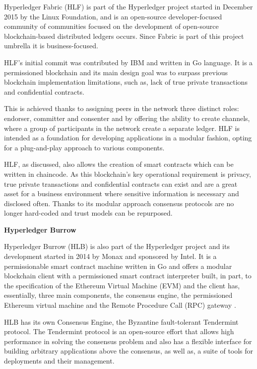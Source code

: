 \documentclass[notitlepage]{llncs}
\begin{document}
Hyperledger Fabric (HLF) is part of the Hyperledger project started in December 2015 by the Linux Foundation, and is an open-source developer-focused community of communities focused on the development of open-source blockchain-based distributed ledgers occurs. Since Fabric is part of  this project umbrella it is business-focused.
\par
HLF’s initial commit was contributed by IBM and written in Go language. It is a permissioned blockchain and its main design goal was to surpass previous blockchain implementation limitations, such as, lack of true private transactions and confidential contracts.
\par
This is achieved thanks to assigning peers in the network three distinct roles: endorser, committer and consenter and by offering the ability to create channels, where a group of participants in the network create a separate ledger. HLF is intended as a foundation for developing applications in a modular fashion, opting for a plug-and-play approach to various components. \cite{HyperledgerFabricDocs2017}
\par
HLF, as discussed, also allows the creation of smart contracts which can be written in chaincode. As this blockchain's key operational requirement is privacy, true private transactions and confidential contracts can exist and are a great asset for a business environment where sensitive information is necessary and disclosed often. Thanks to its modular approach consensus protocols are no longer hard-coded and trust models can be repurposed.
\par
\vspace{10pt}
\textbf{Hyperledger Burrow}
\vspace{6pt}

Hyperledger Burrow (HLB) is also part of the Hyperledger project and its development started in 2014 by Monax and sponsored by Intel. It is a permissionable smart contract machine written in Go and offers a modular blockchain client with a permissioned smart contract interpreter built, in part, to the specification of the Ethereum Virtual Machine (EVM) and the client has, essentially, three main components, the consensus engine, the permissioned Ethereum virtual machine and the Remote Procedure Call (RPC) gateway .
\cite{Kuhlman2017,HyperledgerBurrow2017}
\par
HLB has its own Consensus Engine, the Byzantine fault-tolerant Tendermint protocol. The Tendermint protocol is an open-source effort that allows high performance in solving the consensus problem and also has a flexible interface for building arbitrary applications above the consensus, as well as, a suite of tools for deployments and their management. \cite{Buchman2016}
\end{document}
